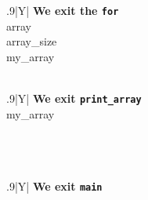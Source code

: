 \documentclass[a4paper]{article}
\begin{document}
\begin{table}[H]
    \begin{subfigure}{0.33333\linewidth}
        \centering
        \begin{tabularx}{.9\linewidth}{|Y|}
        \hline
        \textbf{We exit the \texttt{for}}\\\hline
        array\\\hline
        array\_size\\\hline
        my\_array\\\hline
        \\ \hline
        \end{tabularx}
    \end{subfigure}%
    \begin{subfigure}{0.33333\linewidth}
        \centering
        \begin{tabularx}{.9\linewidth}{|Y|}
        \hline
        \textbf{We exit \texttt{print\_array}} \\\hline
        my\_array\\\hline
        \\ \hline
        \\ \hline
        \\ \hline
        \end{tabularx}
    \end{subfigure}%
    \begin{subfigure}{0.33333\linewidth}
        \centering
        \begin{tabularx}{.9\linewidth}{|Y|}
        \hline
        \textbf{We exit \texttt{main}} \\\hline
        \\\hline
        \\ \hline
        \\ \hline
        \\ \hline
        \end{tabularx}
    \end{subfigure}%
\caption{Example of the state of the stack in an execution}
\label{tab:stackExample}
\end{table}
\end{document}
